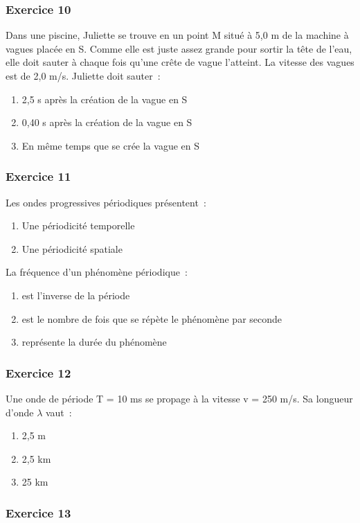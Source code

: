 \subsubsection*{Exercice 10}
  Dans une piscine, Juliette se trouve en un point M situé à 5,0
  m de la machine à vagues placée en S. Comme elle est juste assez
  grande pour sortir la tête de l'eau, elle doit sauter à chaque fois
  qu'une crête de vague l'atteint. La vitesse des vagues est de 2,0 m/s.
  Juliette doit sauter~: 
\begin{enumerate}
\item
  2,5 s après la création de la vague en S
\item
  0,40 s après la création de la vague en S
\item
  En même temps que se crée la vague en S
\end{enumerate}

\subsubsection*{Exercice 11}
Les ondes progressives périodiques présentent~: 
\begin{enumerate}
\item  Une périodicité temporelle
\item  Une périodicité spatiale
\end{enumerate}
La fréquence d'un phénomène périodique~: 
\begin{enumerate}
\item est l'inverse de la période
\item est le nombre de fois que se répète le phénomène par seconde
\item représente la durée du phénomène
\end{enumerate}


\subsubsection*{Exercice 12}

Une onde de période T = 10 ms se propage à la vitesse v = 250 \si{ m/s}. Sa longueur d'onde $\lambda$ vaut~: 
\begin{enumerate}
\item  2,5 \si{m}
\item
  2,5 km
\item
  25 km
\end{enumerate}

\subsubsection*{Exercice 13}


